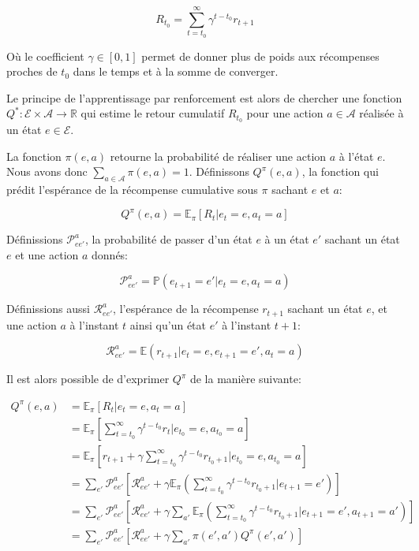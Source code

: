 \documentclass[11pt]{article}
\begin{document}
\begin{latex}
\[
R_{t_0} = \sum^\infty_{t=t_0} \gamma^{t-t_0}r_{t+1}
\]
\end{latex}

Où le coefficient \(\gamma \in [0,1]\) permet de donner plus de poids aux récompenses proches de \(t_0\) dans le temps et à la somme de converger.

Le principe de l'apprentissage par renforcement est alors de chercher une fonction \(Q^*: \mathcal{E} \times \mathcal{A} \longrightarrow \mathbb{R}\) qui estime le retour cumulatif \(R_{t_0}\) pour une action \(a \in \mathcal{A}\) réalisée à un état \(e \in \mathcal{E}\).

La fonction \(\pi(e,a)\) retourne la probabilité de réaliser une action \(a\) à l'état \(e\). Nous avons donc \(\sum_{a\in\mathcal{A}}\pi(e,a) = 1\). Définissons \(Q^\pi(e,a)\), la fonction qui prédit l'espérance de la récompense cumulative sous \(\pi\) sachant \(e\) et \(a\):

\begin{latex}
\[
Q^\pi(e, a) = \mathbb{E}_\pi[R_t|e_t=e,a_t=a]
\]
\end{latex}

Définissions \(\mathcal{P}^a_{ee'}\), la probabilité de passer d'un état \(e\) à un état \(e'\) sachant un état \(e\) et une action \(a\) donnés:

\begin{latex}
\[
\mathcal{P}^a_{ee'} = \mathbb{P}(e_{t+1}=e'|e_t=e, a_t=a)
\]
\end{latex}

Définissions aussi \(\mathcal{R}^a_{ee'}\), l'espérance de la récompense \(r_{t+1}\)
sachant un état \(e\), et une action \(a\) à l'instant \(t\) ainsi qu'un état \(e'\) à
l'instant \(t+1\):

\begin{latex}
\[
\mathcal{R}^a_{ee'} = \mathbb{E}(r_{t+1}|e_t=e, e_{t+1}=e', a_t=a)
\]
\end{latex}

Il est alors possible de d'exprimer \(Q^\pi\) de la manière suivante:

\begin{latex}
\begin{align}
Q^\pi(e, a) &= \mathbb{E}_\pi[R_t|e_t=e,a_t=a] \\
&= \mathbb{E}_\pi[\sum_{t=t_0}^\infty \gamma^{t-t_0}r_t|e_{t_0}=e,a_{t_0}=a] \\
&= \mathbb{E}_\pi[r_{t+1}+\gamma\sum_{t=t_0}^\infty \gamma^{t-t_0}r_{t_0+1}|e_{t_0}=e,a_{t_0}=a] \\
&= \sum_{e'}\mathcal{P}^a_{ee'}\left[ \mathcal{R}^a_{ee'} +
  \gamma\mathbb{E}_\pi \left( \sum^\infty_{t=t_0}\gamma^{t-t_0}r_{t_0+1}|e_{t+1}=e' \right) \right] \\
&= \sum_{e'}\mathcal{P}^a_{ee'}\left[ \mathcal{R}^a_{ee'} +
  \gamma\sum_{a'}\mathbb{E}_\pi \left(
    \sum^\infty_{t=t_0}\gamma^{t-t_0}r_{t_0+1}|e_{t+1}=e', a_{t+1}=a' \right) \right] \\
&= \sum_{e'}\mathcal{P}^a_{ee'}\left[ \mathcal{R}^a_{ee'} +
  \gamma\sum_{a'} \pi(e',a')Q^\pi(e', a') \right]
\end{align}
\end{latex}
\end{document}
